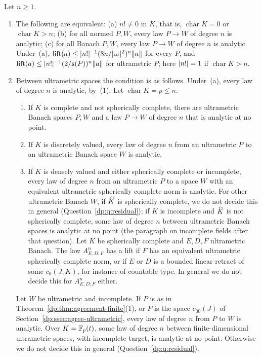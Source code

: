 \begin{theorem}\label{dp:thm:degree-threshold}
Let $n\ge1$.
\begin{enumerate}
\item The following are equivalent: \textup{(a)} $n!\ne0$ in $K$, that is, $\operatorname{char}K=0$ or $\operatorname{char}K>n$; \textup{(b)} for all normed $P,W$, every law $P\to W$ of degree $n$ is analytic; \textup{(c)} for all Banach $P,W$, every law $P\to W$ of degree $n$ is analytic. Under~\textup{(a)}, $\operatorname{lift}(a)\le\lvert n!\rvert^{-1}(8n/\lvert \varpi\rvert^2)^n\lVert a\rVert$ for every $P$, and $\operatorname{lift}(a)\le\lvert n!\rvert^{-1}(2/\mathfrak s(P))^n\lVert a\rVert$ for ultrametric $P$; here $\lvert n!\rvert=1$ if $\operatorname{char}K>n$.
\item Between ultrametric spaces the condition is as follows. Under~\textup{(a)}, every law of degree $n$ is analytic, by~\textup{(1)}. Let $\operatorname{char}K=p\le n$.
\begin{enumerate}
\item If $K$ is complete and not spherically complete, there are ultrametric Banach spaces $P,W$ and a law $P\to W$ of degree $n$ that is analytic at no point.
\item If $K$ is discretely valued, every law of degree $n$ from an ultrametric $P$ to an ultrametric Banach space $W$ is analytic.
\item If $K$ is densely valued and either spherically complete or incomplete, every law of degree $n$ from an ultrametric $P$ to a space $W$ with an equivalent ultrametric spherically complete norm is analytic. For other ultrametric Banach $W$, if $\widehat K$ is spherically complete, we do not decide this in general (Question~\ref{dp:q:residual}); if $K$ is incomplete and $\widehat K$ is not spherically complete, some law of degree $n$ between ultrametric Banach spaces is analytic at no point (the paragraph on incomplete fields after that question). Let $K$ be spherically complete and $E,D,F$ ultrametric Banach. The law $A^n_{E,D;F}$ has a lift if $F$ has an equivalent ultrametric spherically complete norm, or if $E$ or $D$ is a bounded linear retract of some $c_0(J,K)$, for instance of countable type. In general we do not decide this for $A^n_{E,D;F}$ either.
\end{enumerate}
Let $W$ be ultrametric and incomplete. If $P$ is as in Theorem~\ref{dp:thm:agreement-finite}(1), or $P$ is the space $c_{00}(J)$ of Section~\ref{dp:ssec:agree-ultrametric}, every law of degree $n$ from $P$ to $W$ is analytic. Over $K=\mathbb F_p(t)$, some law of degree $n$ between finite-dimensional ultrametric spaces, with incomplete target, is analytic at no point. Otherwise we do not decide this in general (Question~\ref{dp:q:residual}).
\end{enumerate}
\end{theorem}

